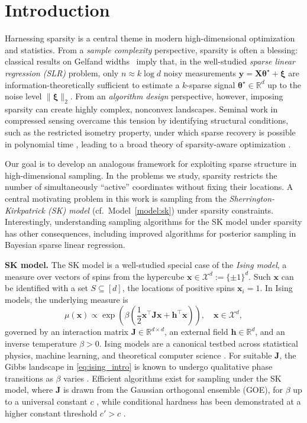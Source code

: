 \documentclass[11pt]{article}
\newcommand{\defeq}{:=}
\newcommand{\norms}[1]{\lVert#1\rVert}
\newcommand{\R}{\mathbb{R}}
\newcommand{\half}{\frac{1}{2}}
\newcommand{\1}{\mathbf{1}}
\newcommand{\0}{\mathbf{0}}
\newcommand{\Par}[1]{\left(#1\right)}
\newcommand{\vth}{\boldsymbol{\theta}}
\newcommand{\vxi}{\boldsymbol{\xi}}
\newcommand{\vths}{\vth^\star}
\newcommand{\mj}{{\mathbf{J}}}
\newcommand{\mx}{{\mathbf{X}}}
\newcommand{\vh}{{\mathbf{h}}}
\newcommand{\vx}{{\mathbf{x}}}
\newcommand{\vy}{{\mathbf{y}}}
\newcommand{\calX}{{\mathcal{X}}}
\begin{document}
\section{Introduction}\label{sec:intro}
Harnessing sparsity is a central theme in modern high-dimensional optimization and statistics. 
From a \emph{sample complexity} perspective, sparsity is often a blessing:
classical results on Gelfand widths~\cite{Kashin77,GarnaevG84} imply that,
in the well-studied \emph{sparse linear regression (SLR)} problem, only \(n \approx k\log d\) noisy
measurements $
\vy=\mx\vths+\vxi$ 
are information-theoretically sufficient to estimate a \(k\)-sparse signal
\(\vths\in\R^d\) up to the noise level \(\norms{\vxi}_2\). From an \emph{algorithm design} perspective, however, imposing sparsity can create highly complex, nonconvex landscapes. Seminal work in compressed sensing overcame this tension by identifying structural conditions, such as the restricted isometry property, under which sparse recovery is possible in polynomial time \cite{CandesT05,CandesT06, CandesRT06,Donoho06}, leading to a broad theory of sparsity-aware optimization \cite{Wainwright19}.

Our goal is to develop an analogous framework for exploiting sparse structure in high-dimensional sampling. In the problems we study, sparsity restricts the number of simultaneously ``active'' coordinates without fixing their locations. A central motivating problem in this work is sampling from the \emph{Sherrington-Kirkpatrick (SK) model} (cf.\ Model~\ref{model:sk}) 
under sparsity constraints. 
Interestingly, understanding sampling algorithms for the SK model under sparsity has other consequences, including improved algorithms for posterior sampling in Bayesian sparse linear regression.

\textbf{SK model.} The SK model is a well-studied special case of the \emph{Ising model}, a measure over vectors of spins from the hypercube $\vx \in \calX^d \defeq \{\pm 1\}^d$. Such $\vx$ can be identified with a set $S \subseteq [d]$, the locations of positive spins $\vx_i = 1$. In Ising models, the underlying measure is
\begin{equation}\label{eq:ising_intro}
    \mu(\vx)
    \propto
    \exp\Par{
        \beta\Par{
            \half \vx^\top \mj \vx
            +
            \vh^\top \vx
        }
    },\quad \vx \in \calX^d,
\end{equation}
governed by an interaction matrix \(\mj \in \R^{d \times d}\), an external field \(\vh \in \R^d\), and an inverse temperature \(\beta>0\). Ising models are a canonical testbed across statistical physics, machine learning, and theoretical computer science \cite{WainwrightJ08,LevinPW09,talagrand2010mean}. For suitable $\mj$, the Gibbs landscape in \eqref{eq:ising_intro} is known to undergo qualitative phase transitions as  \(\beta\) varies \cite{talagrand2010mean}.  
Efficient algorithms exist for sampling under the SK model, where \(\mj\) is drawn from the Gaussian orthogonal ensemble (GOE),  for $\beta$ up to a universal constant $c$ \cite{EldanKZ22, AnariJKPV22, AlaouiMS22, AnariKV24, DaviesLSS26}, while conditional hardness has been demonstrated at a higher constant threshold $c' > c$ \cite{AlaouiMS22}.
\end{document}
